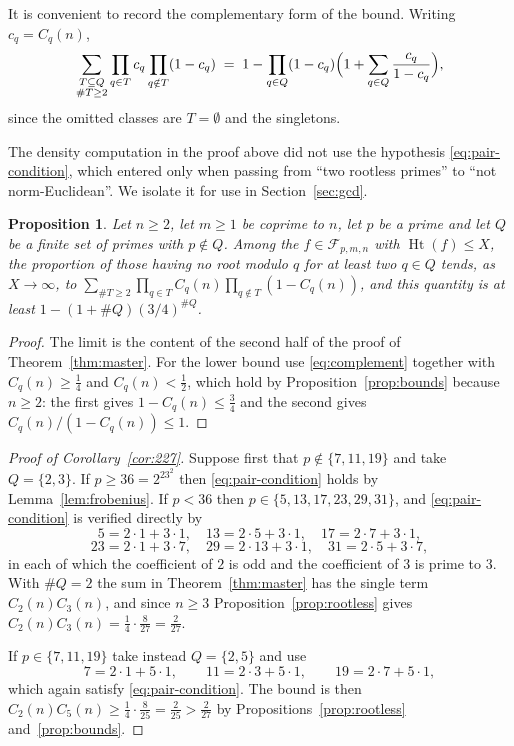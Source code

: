 \documentclass[11pt,reqno]{amsart}
\theoremstyle{plain}
\newtheorem{proposition}[theorem]{Proposition}
\theoremstyle{definition}
\theoremstyle{remark}
\newcommand{\Ht}{\operatorname{Ht}}
\begin{document}
It is convenient to record the complementary form of the bound. Writing $c_q=C_q(n)$,
\begin{equation}\label{eq:complement}
  \sum_{\substack{T\subseteq Q\\ \#T\ge2}}\prod_{q\in T}c_q\prod_{q\notin T}(1-c_q)
  \;=\;1-\prod_{q\in Q}(1-c_q)\Bigl(1+\sum_{q\in Q}\frac{c_q}{1-c_q}\Bigr),
\end{equation}
since the omitted classes are $T=\emptyset$ and the singletons.

The density computation in the proof above did not use the hypothesis
\eqref{eq:pair-condition}, which entered only when passing from ``two rootless primes'' to
``not norm-Euclidean''. We isolate it for use in Section~\ref{sec:gcd}.

\begin{proposition}\label{prop:two-rootless}
Let $n\ge2$, let $m\ge1$ be coprime to $n$, let $p$ be a prime and let $Q$ be a finite set of
primes with $p\notin Q$. Among the $f\in\mathcal F_{p,m,n}$ with $\Ht(f)\le X$, the proportion of
those having no root modulo $q$ for at least two $q\in Q$ tends, as $X\to\infty$, to
$\sum_{\#T\ge2}\prod_{q\in T}C_q(n)\prod_{q\notin T}(1-C_q(n))$, and this quantity is at least
$1-(1+\#Q)(3/4)^{\#Q}$.
\end{proposition}

\begin{proof}
The limit is the content of the second half of the proof of Theorem~\ref{thm:master}. For the
lower bound use \eqref{eq:complement} together with $C_q(n)\ge\frac14$ and $C_q(n)<\frac12$,
which hold by Proposition~\ref{prop:bounds} because $n\ge2$: the first gives
$1-C_q(n)\le\frac34$ and the second gives $C_q(n)/(1-C_q(n))\le1$.
\end{proof}

\begin{proof}[Proof of Corollary~\ref{cor:227}]
Suppose first that $p\notin\{7,11,19\}$ and take $Q=\{2,3\}$. If $p\ge36=2^23^2$ then
\eqref{eq:pair-condition} holds by Lemma~\ref{lem:frobenius}. If $p<36$ then
$p\in\{5,13,17,23,29,31\}$, and \eqref{eq:pair-condition} is verified directly by
\[
  5=2\cdot1+3\cdot1,\quad 13=2\cdot 5+3\cdot 1,\quad 17=2\cdot7+3\cdot1,
\]
\[
  23=2\cdot1+3\cdot7,\quad 29=2\cdot13+3\cdot1,\quad 31=2\cdot5+3\cdot7,
\]
in each of which the coefficient of $2$ is odd and the coefficient of $3$ is prime to $3$. With
$\#Q=2$ the sum in Theorem~\ref{thm:master} has the single term $C_2(n)C_3(n)$, and since $n\ge3$
Proposition~\ref{prop:rootless} gives
$C_2(n)C_3(n)=\frac14\cdot\frac8{27}=\frac{2}{27}$.

If $p\in\{7,11,19\}$ take instead $Q=\{2,5\}$ and use
\[
  7=2\cdot1+5\cdot1,\qquad 11=2\cdot3+5\cdot1,\qquad 19=2\cdot7+5\cdot1 ,
\]
which again satisfy \eqref{eq:pair-condition}. The bound is then
$C_2(n)C_5(n)\ge\frac14\cdot\frac8{25}=\frac2{25}>\frac2{27}$ by Propositions~\ref{prop:rootless}
and~\ref{prop:bounds}.
\end{proof}
\end{document}
